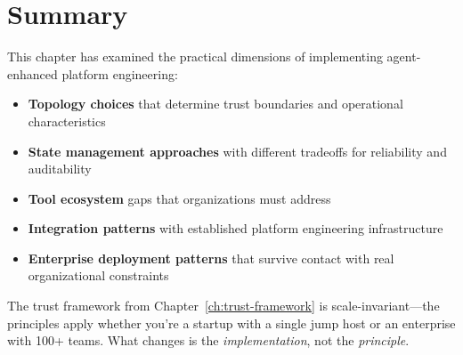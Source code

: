 \section{Summary}
\label{sec:implementation-summary}

This chapter has examined the practical dimensions of implementing agent-enhanced platform engineering:

\begin{itemize}
    \item \textbf{Topology choices} that determine trust boundaries and operational characteristics
    \item \textbf{State management approaches} with different tradeoffs for reliability and auditability
    \item \textbf{Tool ecosystem} gaps that organizations must address
    \item \textbf{Integration patterns} with established platform engineering infrastructure
    \item \textbf{Enterprise deployment patterns} that survive contact with real organizational constraints
\end{itemize}

The trust framework from Chapter~\ref{ch:trust-framework} is scale-invariant---the principles apply whether you're a startup with a single jump host or an enterprise with 100+ teams. What changes is the \textit{implementation}, not the \textit{principle}.
